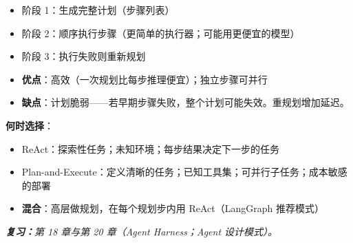 \begin{questionbox}
\begin{itemize}
  \item 阶段 1：生成完整计划（步骤列表）
  \item 阶段 2：顺序执行步骤（更简单的执行器；可能用更便宜的模型）
  \item 阶段 3：执行失败则重新规划
  \item \textbf{优点}：高效（一次规划比每步推理便宜）；独立步骤可并行
  \item \textbf{缺点}：计划脆弱——若早期步骤失败，整个计划可能失效。重规划增加延迟。
\end{itemize}

\textbf{何时选择}：

\begin{itemize}
  \item ReAct：探索性任务；未知环境；每步结果决定下一步的任务
  \item Plan-and-Execute：定义清晰的任务；已知工具集；可并行子任务；成本敏感的部署
  \item \textbf{混合}：高层做规划，在每个规划步内用 ReAct（LangGraph 推荐模式）
\end{itemize}

\emph{\textbf{复习：}第 18 章与第 20 章（Agent Harness；Agent 设计模式）。}
\end{questionbox}

